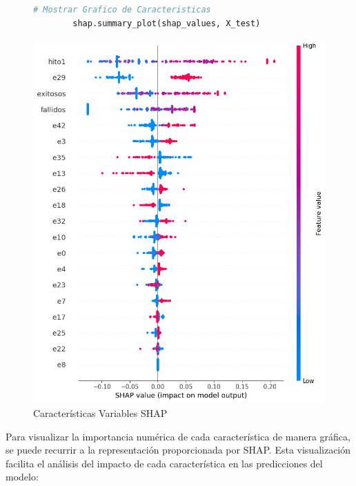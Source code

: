 \begin{figure}[H]
    \centering
    \begin{minipage}{0.48\textwidth}
        \begin{lstlisting}[language=Python, caption=Grafico de Caracteristicas, label=lst:graf_caracteristicas]
        # Mostrar Grafico de Caracteristicas
        shap.summary_plot(shap_values, X_test)
        \end{lstlisting}
    \end{minipage}
    \hfill
    \begin{minipage}{0.48\textwidth}
        \centering
        \includegraphics[width=0.9\linewidth]{img/shap_rf/shapForcePlot2.png}
        \caption{Características Variables SHAP}
        \label{fig:caract_var_shap}
    \end{minipage}
\end{figure}


Para visualizar la importancia numérica de cada característica de manera gráfica, se puede recurrir a la representación proporcionada por SHAP. Esta visualización facilita el análisis del impacto de cada característica en las predicciones del modelo:

